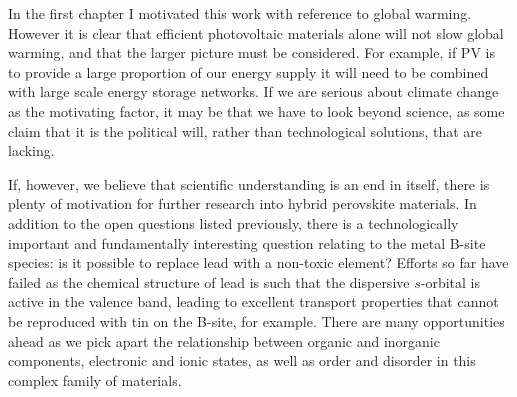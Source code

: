In the first chapter I motivated this work with reference to global warming. However it is clear that efficient photovoltaic materials alone will not slow global warming, and that the larger picture must be considered. For example, if PV is to provide a large proportion of our energy supply it will need to be combined with large scale energy storage networks. If we are serious about climate change as the motivating factor, it may be that we have to look beyond science, as some claim that it is the political will, rather than technological solutions, that are lacking. 

If, however, we believe that scientific understanding is an end in itself, there is plenty of motivation for further research into hybrid perovskite materials. In addition to the open questions listed previously, there is a technologically important and fundamentally interesting question relating to the metal B-site species: is it possible to replace lead with a non-toxic element? Efforts so far have failed as the chemical structure of lead is such that the dispersive $s$-orbital is active in the valence band, leading to excellent transport properties that cannot be reproduced with tin on the B-site, for example.
There are many opportunities ahead as we pick apart the relationship between organic and inorganic components, electronic and ionic states, as well as order and disorder in this complex family of materials.



